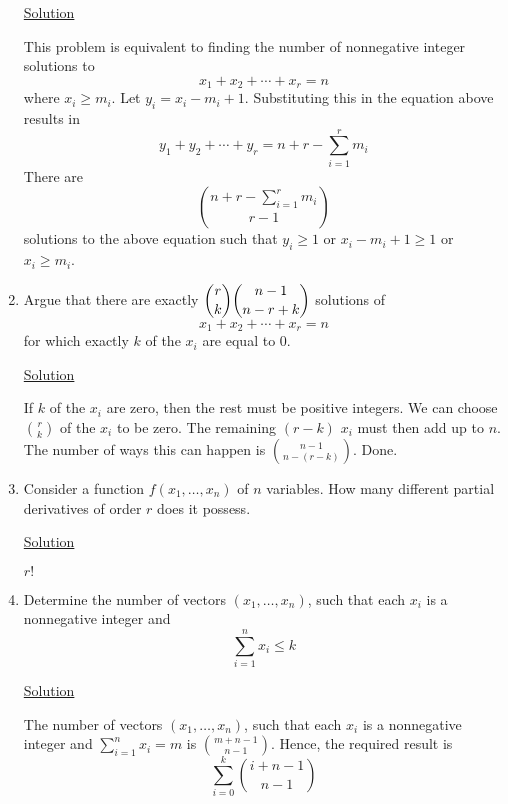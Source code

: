 \begin{enumerate}
\underline{Solution}

This problem is equivalent to finding the number of nonnegative integer 
solutions to
\[x_1 + x_2 + \cdots + x_r = n\]
where $x_i \ge m_i$. Let $y_i = x_i - m_i + 1$. Substituting this in the 
equation above results in
\[y_1 + y_2 + \cdots + y_r = n + r - \sum_{i=1}^rm_i\]
There are
\[\binom{n + r - \sum_{i=1}^rm_i}{r-1}\]
solutions to the above equation such that $y_i \ge 1$ or $x_i - m_i + 1 \ge 1$
or $x_i \ge m_i$. 

\item Argue that there are exactly $\dbinom{r}{k}\dbinom{n-1}{n-r+k}$ solutions
of
\[x_1+x_2+\cdots+x_r = n\]
for which exactly $k$ of the $x_i$ are equal to $0$.

\underline{Solution}

If $k$ of the $x_i$ are zero, then the rest must be positive integers. We can
choose $\binom{r}{k}$ of the $x_i$ to be zero. The remaining $(r-k)$ $x_i$ must
then add up to $n$. The number of ways this can happen is
$\binom{n-1}{n-(r-k)}$. Done.

\item Consider a function $f(x_1, \ldots, x_n)$ of $n$ variables. How many 
different partial derivatives of order $r$ does it possess.

\underline{Solution}

$r!$

\item Determine the number of vectors $(x_1, \ldots, x_n)$, such that each $x_i$
is a nonnegative integer and
\[\sum_{i=1}^nx_i \le k\]

\underline{Solution}

The number of vectors $(x_1, \ldots, x_n)$, such that each $x_i$
is a nonnegative integer and $\sum_{i=1}^nx_i = m$ is $\binom{m+n-1}{n-1}$. 
Hence, the required result is
\[\sum_{i=0}^k\binom{i+n-1}{n-1}\]

\end{enumerate}
